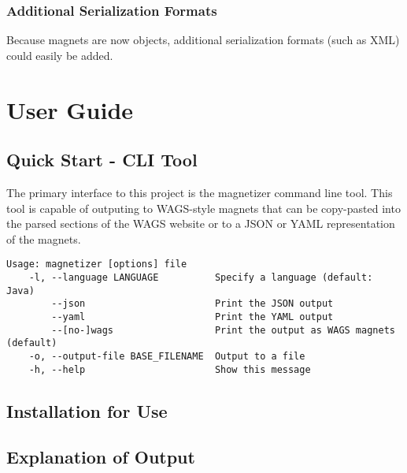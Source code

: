 \documentclass[letter,10pt]{article}
\begin{document}
\subsubsection{Additional Serialization Formats}

Because magnets are now objects, additional serialization formats (such 
as XML) could easily be added. 



\section{User Guide}

\subsection{Quick Start - CLI Tool}

The primary interface to this project is the magnetizer command line 
tool. This tool is capable of outputing to WAGS-style magnets that can 
be copy-pasted into the parsed sections of the WAGS website or to a 
JSON or YAML representation of the magnets.

\begin{verbatim}
Usage: magnetizer [options] file
    -l, --language LANGUAGE          Specify a language (default: Java)
        --json                       Print the JSON output
        --yaml                       Print the YAML output
        --[no-]wags                  Print the output as WAGS magnets 
(default)
    -o, --output-file BASE_FILENAME  Output to a file
    -h, --help                       Show this message
\end{verbatim}



\subsection{Installation for Use}

\subsection{Explanation of Output}
\end{document}

